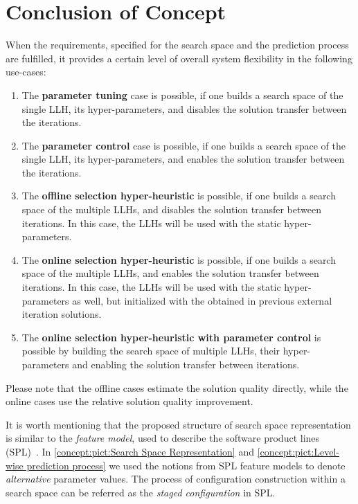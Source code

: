 \section{Conclusion of Concept}\label{concept: conclution}
When the requirements, specified for the search space and the prediction process are fulfilled, it provides a certain level of overall system flexibility in the following use-cases:
\begin{enumerate}
	\item The \textbf{parameter tuning} case is possible, if one builds a search space of the single LLH, its hyper-parameters, and disables the solution transfer between the iterations.
	
	\item The \textbf{parameter control} case is possible, if one builds a search space of the single LLH, its hyper-parameters, and enables the solution transfer between the iterations. 
	
	\item The \textbf{offline selection hyper-heuristic} is possible, if one builds a search space of the multiple LLHs, and disables the solution transfer between iterations. In this case, the LLHs will be used with the static hyper-parameters.
	
	\item The \textbf{online selection hyper-heuristic} is possible, if one builds a search space of the multiple LLHs, and enables the solution transfer between iterations. In this case, the LLHs will be used with the static hyper-parameters as well, but initialized with the obtained in previous external iteration solutions.
	
	\item The \textbf{online selection hyper-heuristic with parameter control} is possible by building the search space of multiple LLHs, their hyper-parameters and enabling the solution transfer between iterations.
\end{enumerate}

Please note that the offline cases estimate the solution quality directly, while the online cases use the relative solution quality improvement.

It is worth mentioning that the proposed structure of search space representation is similar to the \emph{feature model}, used to describe the software product lines (SPL)~\cite{schroeter2012multi}. In \cref{concept:pict:Search Space Representation} and \cref{concept:pict:Level-wise prediction process} we used the notions from SPL feature models to denote \emph{alternative} parameter values. The process of configuration construction within a search space can be referred as the \emph{staged configuration} in SPL.